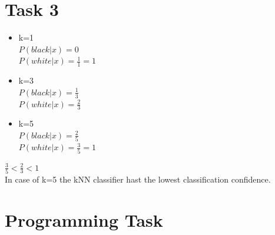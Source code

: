 \documentclass[a4paper]{scrartcl}
\begin{document}
\pagebreak
\section*{Task 3}
\begin{itemize}
	\item k=1\\ $P(black|x)=0$\\ $P(white|x)=\frac{1}{1} = 1$
	\item k=3\\ $P(black|x)=\frac{1}{3}$\\ $P(white|x)=\frac{2}{3}$
	\item k=5\\ $P(black|x)=\frac{2}{5}$\\ $P(white|x)=\frac{3}{5} = 1$
\end{itemize}
$\frac{3}{5}<\frac{2}{3}<1$\\ 
In case of k=5 the kNN classifier hast the lowest classification confidence.







\section*{Programming Task}

\end{document}
